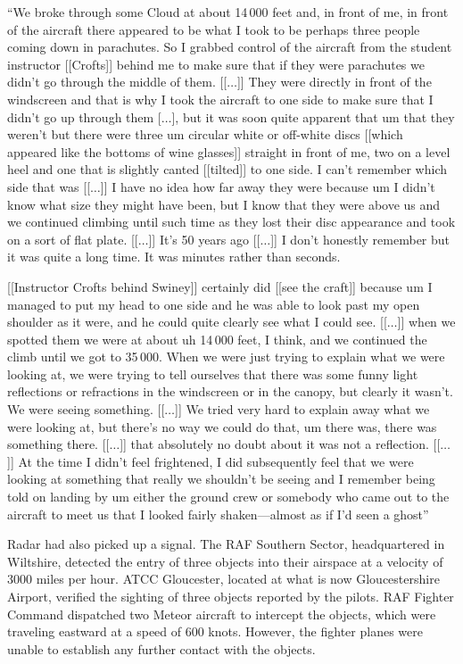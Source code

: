 \begin{svgraybox}
``We broke through some
Cloud at about 14\,000 feet and,  in front of me, in front of the aircraft there appeared to be what I took to be perhaps
three people coming down in parachutes. So I grabbed control of the aircraft from the student instructor [[Crofts]]
behind me to make sure that if they were parachutes we didn't go through the middle of them.
[[$\ldots$]] They were directly in front of the windscreen and that is why I  took the aircraft
to one side to make sure that I didn't go up through them [$\ldots$],
but it was soon quite apparent that um that they weren't but there were three um circular white or off-white discs [[which appeared like the bottoms of wine glasses]]
straight in front of me,
two on a level heel and one that is slightly canted [[tilted]] to one side.
I can't remember which side that was [[$\ldots$]] I have no idea how far away they were because um I didn't know what size they might have been,
but I know that they were above us and we continued climbing until such time as they lost their disc
appearance and took on a sort of flat plate.
[[$\ldots$]]
It's 50 years ago [[$\ldots$]] I don't honestly remember but it was quite a long time. It was minutes rather than seconds.

[[Instructor Crofts behind Swiney]]
certainly did [[see the craft]]  because um I managed to put my head to one side and he was able to look past my  open shoulder as it were,
and he could quite clearly see what I could see.
[[$\ldots$]]  when we spotted them we were at about uh 14\,000 feet, I think, and we continued the climb until we got to  35\,000.
When we were just trying to explain what we were looking at, we were trying to tell ourselves that there was some funny light reflections or refractions
in the windscreen or in the  canopy, but clearly it wasn't. We were seeing something.
[[$\ldots$]]  We tried very hard to explain away   what we were looking at,  but
there's no way we could do that, um there was, there was something there.
[[$\ldots$]]
that absolutely no doubt about it was not a reflection.
[[$\ldots$]] At the time
I didn't feel frightened, I did subsequently feel that we were looking at something that really we shouldn't be seeing
and I remember being told on landing by um either the ground crew or somebody who came out to the aircraft
to meet us that I looked fairly shaken---almost as if I'd seen a ghost''
\end{svgraybox}
Radar had also picked up a signal.
The RAF Southern Sector, headquartered in Wiltshire, detected the entry of three objects into their airspace at a velocity of 3000 miles per hour.
ATCC Gloucester, located at what is now Gloucestershire Airport, verified the sighting of three objects reported by the pilots.
RAF Fighter Command dispatched two Meteor aircraft to intercept the objects, which were traveling eastward at a speed of 600 knots.
However, the fighter planes were unable to establish any further contact with the objects.



